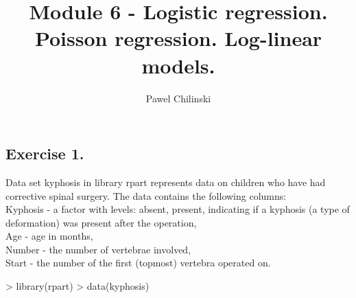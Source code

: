 \documentclass[a4paper]{article}
\title{Module 6 - Logistic regression. Poisson regression. Log-linear models.}
\author{Pawel Chilinski}
\begin{document}

\maketitle
\subsection{Exercise 1.} Data set kyphosis in library rpart represents data on
children who have had corrective spinal surgery. The data contains the following
columns:\\
Kyphosis - a factor with levels: absent, present, indicating if a kyphosis (a type of deformation) was
present after the operation,\\
Age - age in months,\\
Number - the number of vertebrae involved,\\
Start - the number of the first (topmost) vertebra operated on.\\
\begin{Schunk}
\begin{Sinput}
> library(rpart)	
> data(kyphosis)
\end{Sinput}
\end{Schunk}
\end{document}
